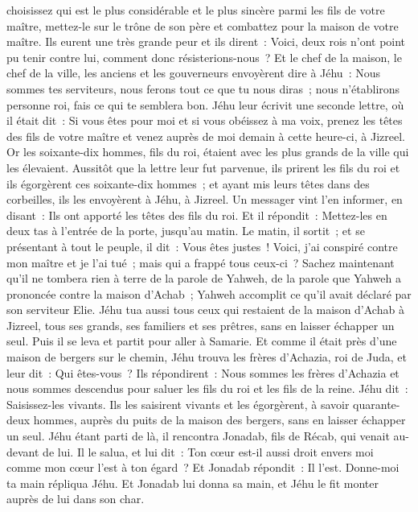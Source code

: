 \begin{multicols}{2}
choisissez qui est le plus considérable et le plus sincère parmi les fils de votre maître, mettez-le sur le trône de son père et combattez pour la maison de votre maître.
Ils eurent une très grande peur et ils dirent~: Voici, deux rois n'ont point pu tenir contre lui, comment donc résisterions-nous~?
Et le chef de la maison, le chef de la ville, les anciens et les gouverneurs envoyèrent dire à Jéhu~: Nous sommes tes serviteurs, nous ferons tout ce que tu nous diras~; nous n'établirons personne roi, fais ce qui te semblera bon.
Jéhu leur écrivit une seconde lettre, où il était dit~: Si vous êtes pour moi et si vous obéissez à ma voix, prenez les têtes des fils de votre maître et venez auprès de moi demain à cette heure-ci, à Jizreel. Or les soixante-dix hommes, fils du roi, étaient avec les plus grands de la ville qui les élevaient.
Aussitôt que la lettre leur fut parvenue, ils prirent les fils du roi et ils égorgèrent ces soixante-dix hommes~; et ayant mis leurs têtes dans des corbeilles, ils les envoyèrent à Jéhu, à Jizreel.
Un messager vint l'en informer, en disant~: Ils ont apporté les têtes des fils du roi. Et il répondit~: Mettez-les en deux tas à l'entrée de la porte, jusqu'au matin.
Le matin, il sortit~; et se présentant à tout le peuple, il dit~: Vous êtes justes~! Voici, j'ai conspiré contre mon maître et je l'ai tué~; mais qui a frappé tous ceux-ci~?
Sachez maintenant qu'il ne tombera rien à terre de la parole de Yahweh, de la parole que Yahweh a prononcée contre la maison d'Achab~; Yahweh accomplit ce qu'il avait déclaré par son serviteur Elie.
Jéhu tua aussi tous ceux qui restaient de la maison d'Achab à Jizreel, tous ses grands, ses familiers et ses prêtres, sans en laisser échapper un seul.
Puis il se leva et partit pour aller à Samarie. Et comme il était près d'une maison de bergers sur le chemin,
Jéhu trouva les frères d'Achazia, roi de Juda, et leur dit~: Qui êtes-vous~? Ils répondirent~: Nous sommes les frères d'Achazia et nous sommes descendus pour saluer les fils du roi et les fils de la reine.
Jéhu dit~: Saisissez-les vivants. Ils les saisirent vivants et les égorgèrent, à savoir quarante-deux hommes, auprès du puits de la maison des bergers, sans en laisser échapper un seul.
Jéhu étant parti de là, il rencontra Jonadab, fils de Récab, qui venait au-devant de lui. Il le salua, et lui dit~: Ton cœur est-il aussi droit envers moi comme mon cœur l'est à ton égard~? Et Jonadab répondit~: Il l'est. Donne-moi ta main répliqua Jéhu. Et Jonadab lui donna sa main, et Jéhu le fit monter auprès de lui dans son char.

\end{multicols}
